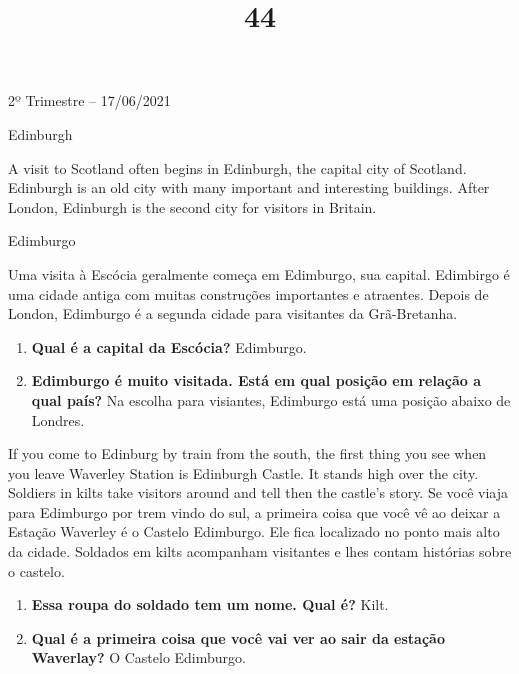\documentclass{SchoolBook}
\begin{document}
    \begin{day}{2º Trimestre -- 17/06/2021}
        \begin{multicols}{2}
            \title{4}{Edinburgh}

            A visit to Scotland often begins in Edinburgh, the capital city of Scotland. Edinburgh is an old city with many important and interesting buildings. After London, Edinburgh is the second city for visitors in Britain.
            \vfill\columnbreak
            \title{4}{Edimburgo}
            
            Uma visita à Escócia geralmente começa em Edimburgo, sua capital. Edimbirgo é uma cidade antiga com muitas construções importantes e atraentes. Depois de London, Edimburgo é a segunda cidade para visitantes da Grã-Bretanha.
        \end{multicols}
        
        \begin{enumerate}
            \item[\bf 1.]\textbf{Qual é a capital da Escócia?}
            \response Edimburgo.
            
            \item[\bf 2.]\textbf{Edimburgo é muito visitada. Está em qual posição em relação a qual país?}
            \response Na escolha para visiantes, Edimburgo está uma posição abaixo de Londres.
        \end{enumerate}
        
        \begin{multicols}{2}
            If you come to Edinburg by train from the south, the first thing you see when you leave Waverley Station is Edinburgh Castle. It stands high over the city. Soldiers in kilts take visitors around and tell then the castle's story.
            \vfill\columnbreak
            Se você viaja para Edimburgo por trem vindo do sul, a primeira coisa que você vê ao deixar a Estação Waverley é o Castelo Edimburgo. Ele fica localizado no ponto mais alto da cidade. Soldados em kilts acompanham visitantes e lhes contam histórias sobre o castelo.
        \end{multicols}
        
        \begin{enumerate}
            \item[\bf 3.]\textbf{Essa roupa do soldado tem um nome. Qual é?}
            \response Kilt.
            
            \item[\bf 4.]\textbf{Qual é a primeira coisa que você vai ver ao sair da estação Waverlay?}
            \response O Castelo Edimburgo.
        \end{enumerate}
        

\end{day}
\end{document}
